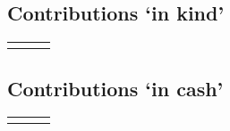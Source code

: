
\subsection{Contributions `in kind'}\label{sec:inkind}

\begin{tabular}[c]{|o{3.6cm}|p{6.5cm}|o{4.6cm}|}
    \hline
    &\centering{}&\\
    \hline
     & \\
    \hline
\end{tabular}


\subsection{Contributions `in cash'}\label{sec:incash}

\begin{tabular}[c]{|o{3.6cm}|o{6.5cm}|o{4.6cm}|}
    \hline
    &&\\
    \hline
     & &\\
    \hline
\end{tabular}


